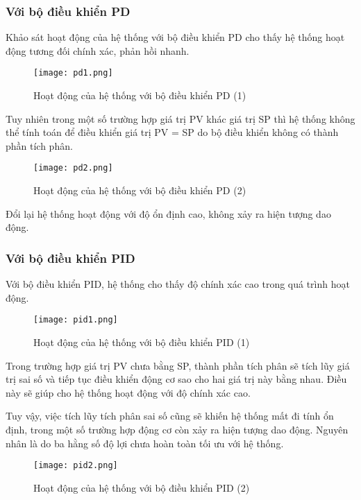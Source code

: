 \subsubsection{Với bộ điều khiển PD}

Khảo sát hoạt động của hệ thống với bộ điều khiển PD cho thấy hệ thống hoạt động tương đối chính xác, phản hồi nhanh. 

 \begin{figure}[h!]
	\centering
	\texttt{[image: pd1.png]}
	\caption[Hoạt động của hệ thống với bộ điều khiển PD (1)]{Hoạt động của hệ thống với bộ điều khiển PD (1)}
	\label{fig:Hoạt động của hệ thống với bộ điều khiển PD (1)}
\end{figure}

Tuy nhiên trong một số trường hợp giá trị PV khác giá trị SP thì hệ thống không thể tính toán để điều khiển giá trị PV = SP do bộ điều khiển không có thành phần tích phân. 

 \begin{figure}[h!]
	\centering
	\texttt{[image: pd2.png]}
	\caption[Hoạt động của hệ thống với bộ điều khiển PD (2)]{Hoạt động của hệ thống với bộ điều khiển PD (2)}
	\label{fig:Hoạt động của hệ thống với bộ điều khiển PD (2)}
\end{figure}

Đổi lại hệ thống hoạt động với độ ổn định cao, không xảy ra hiện tượng dao động.
\newpage
\subsubsection{Với bộ điều khiển PID}

Với bộ điều khiển PID, hệ thống cho thấy độ chính xác cao trong quá trình hoạt động.

 \begin{figure}[h!]
	\centering
	\texttt{[image: pid1.png]}
	\caption[Hoạt động của hệ thống với bộ điều khiển PID (1)]{Hoạt động của hệ thống với bộ điều khiển PID (1)}
	\label{fig:Hoạt động của hệ thống với bộ điều khiển PID (1)}
\end{figure}

Trong trường hợp giá trị PV chưa bằng SP, thành phần tích phân sẽ tích lũy giá trị sai số và tiếp tục điều khiển động cơ sao cho hai giá trị này bằng nhau. Điều này sẽ giúp cho hệ thống hoạt động với độ chính xác cao.

Tuy vậy, việc tích lũy tích phân sai số cũng sẽ khiến hệ thống mất đi tính ổn định, trong một số trường hợp động cơ còn xảy ra hiện tượng dao động. Nguyên nhân là do ba hằng số độ lợi chưa hoàn toàn tối ưu với hệ thống.

 \begin{figure}[h!]
	\centering
	\texttt{[image: pid2.png]}
	\caption[Hoạt động của hệ thống với bộ điều khiển PID (2)]{Hoạt động của hệ thống với bộ điều khiển PID (2)}
	\label{fig:Hoạt động của hệ thống với bộ điều khiển PID (2)}
\end{figure}
